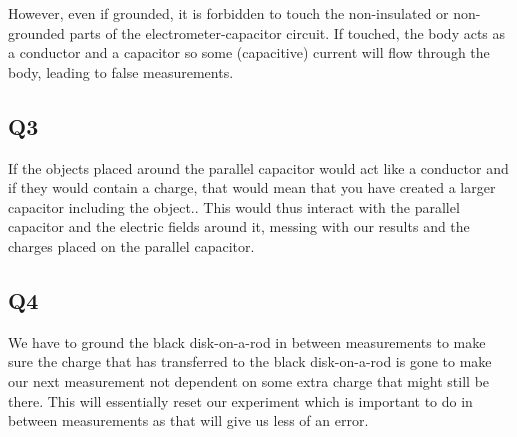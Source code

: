 However, even if grounded, it is forbidden to touch the non-insulated or non-grounded parts of the electrometer-capacitor circuit. If touched, the body acts as a conductor and a capacitor so some (capacitive) current will flow through the body, leading to false measurements.

\subsection{Q3}

If the objects placed around the parallel capacitor would act like a conductor and if they would contain a charge, that would mean that you have created a larger capacitor including the object.. This would thus interact with the parallel capacitor and the electric fields around it, messing with our results and the charges placed on the parallel capacitor. 

\subsection{Q4}

We have to ground the black disk-on-a-rod in between measurements to make sure the charge that has transferred to the black disk-on-a-rod is gone to make our next measurement not dependent on some extra charge that might still be there. This will essentially reset our experiment which is important to do in between measurements as that will give us less of an error. 